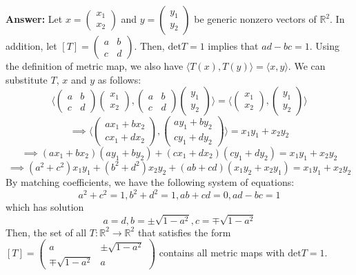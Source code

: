 \documentclass{article}
\begin{document}
\begin{itemize}
\begin{itemize}
		\textbf{Answer: } Let $x=\begin{pmatrix}x_1\\x_2\end{pmatrix}$ and $y=\begin{pmatrix}y_1\\y_2\end{pmatrix}$ be generic nonzero vectors of $\mathbb{R}^2$. In addition, let $[T]=\begin{pmatrix}a&b\\c&d\end{pmatrix}$. Then, $\text{det}T=1$ implies that $ad-bc=1$. Using the definition of metric map, we also have $\langle T(x),T(y)\rangle=\langle x,y\rangle$. We can substitute $T$, $x$ and $y$ as follows: \[\langle\begin{pmatrix}a&b\\c&d\end{pmatrix}\begin{pmatrix}x_1\\x_2\end{pmatrix},\begin{pmatrix}a&b\\c&d\end{pmatrix}\begin{pmatrix}y_1\\y_2\end{pmatrix}\rangle=\langle\begin{pmatrix}x_1\\x_2\end{pmatrix},\begin{pmatrix}y_1\\y_2\end{pmatrix}\rangle\]\[\implies\langle\begin{pmatrix}ax_1+bx_2\\cx_1+dx_2\end{pmatrix},\begin{pmatrix}ay_1+by_2\\cy_1+dy_2\end{pmatrix}\rangle=x_1y_1+x_2y_2\]\[\implies(ax_1+bx_2)(ay_1+by_2)+(cx_1+dx_2)(cy_1+dy_2)=x_1y_1+x_2y_2\]\[\implies(a^2+c^2)x_1y_1+(b^2+d^2)x_2y_2+(ab+cd)(x_1y_2+x_2y_1)=x_1y_1+x_2y_2\] By matching coefficients, we have the following system of equations:\[a^2+c^2=1,b^2+d^2=1,ab+cd=0,ad-bc=1\] which has solution \[a=d,b=\pm\sqrt{1-a^2},c=\mp\sqrt{1-a^2}\] Then, the set of all $T:\mathbb{R}^2\rightarrow\mathbb{R}^2$ that satisfies the form $[T]=\begin{pmatrix}a&\pm\sqrt{1-a^2}\\\mp\sqrt{1-a^2}&a\end{pmatrix}$ contains all metric maps with $\text{det}T=1$.

\end{itemize}
\end{itemize}
\end{document}
